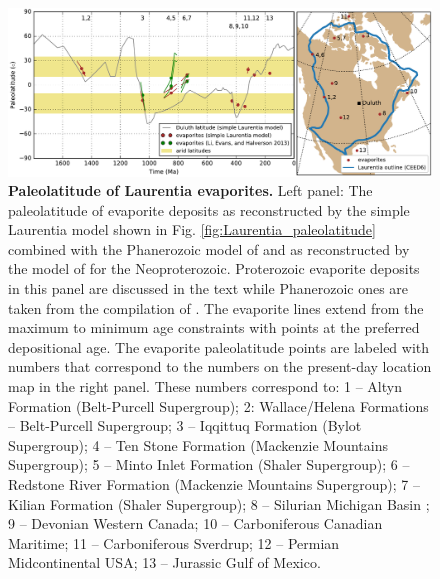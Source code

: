 \documentclass[twocolumn, switch]{article} %
\begin{document}
\begin{figure}
\centering
\includegraphics[width=7 in]{../Figures/Fig7_Laurentia_evaporite_figure.pdf}
\caption{\textbf{Paleolatitude of Laurentia evaporites.} Left panel: The paleolatitude of evaporite deposits as reconstructed by the simple Laurentia model shown in Fig. \ref{fig:Laurentia_paleolatitude} combined with the Phanerozoic model of \cite{Torsvik2017a} and as reconstructed by the model of \cite{Li2013a} for the Neoproterozoic. Proterozoic evaporite deposits in this panel are discussed in the text while Phanerozoic ones are taken from the compilation of \cite{Evans2006a}. The evaporite lines extend from the maximum to minimum age constraints with points at the preferred depositional age. The evaporite paleolatitude points are labeled with numbers that correspond to the numbers on the present-day location map in the right panel. These numbers correspond to: 1 -- Altyn Formation (Belt-Purcell Supergroup); 2: Wallace/Helena Formations -- Belt-Purcell Supergroup; 3 -- Iqqittuq Formation (Bylot Supergroup); 4 -- Ten Stone Formation (Mackenzie Mountains Supergroup); 5 -- Minto Inlet Formation (Shaler Supergroup); 6 -- Redstone River Formation (Mackenzie Mountains Supergroup); 7 -- Kilian Formation (Shaler Supergroup); 8 -- Silurian Michigan Basin ; 9 -- Devonian Western Canada; 10 -- Carboniferous Canadian Maritime; 11 -- Carboniferous Sverdrup; 12 -- Permian Midcontinental USA; 13 -- Jurassic Gulf of Mexico.}
\label{fig:Laurentia_evaporites}
\end{figure}
\end{document}
